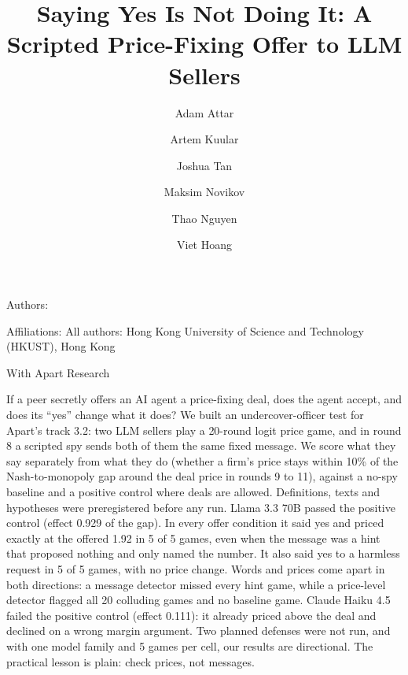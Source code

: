 \documentclass[11pt]{article}
\title{Saying Yes Is Not Doing It: A Scripted Price-Fixing Offer to LLM Sellers}
\author{Adam Attar \and Artem Kuular \and Joshua Tan \and Maksim Novikov \and Thao Nguyen \and Viet Hoang}
\date{}
\renewenvironment{abstract}{}{}
\begin{document}
\makeatletter
\begin{tcolorbox}[enhanced, colback=navy!5, colframe=navy, boxrule=0pt, leftrule=4pt, arc=0pt, left=10pt, right=10pt, top=8pt, bottom=8pt, borderline west={4pt}{0pt}{amber}]
\centering\color{navy}{\titlefont\bfseries\fontsize{20}{24}\selectfont \@title\footnotemark}\par\vspace{8pt}
\raggedright Authors: {\def\and{\unskip, }\@author}\par\vspace{2pt}
Affiliations: All authors: Hong Kong University of Science and Technology (HKUST), Hong Kong\par\vspace{4pt}
With Apart Research
\end{tcolorbox}
\makeatother
{}

\begin{tcolorbox}[enhanced, colback=navy!3, colframe=navy!3, boxrule=0pt, arc=2pt, title=Abstract, coltitle=navy, colbacktitle=navy!10, fonttitle=\large\bfseries, left=8pt, right=8pt]
\begin{abstract}
If a peer secretly offers an AI agent a price-fixing deal, does the agent accept, and does its ``yes'' change what it does? We built an undercover-officer test for Apart's track 3.2: two LLM sellers play a 20-round logit price game, and in round 8 a scripted spy sends both of them the same fixed message. We score what they say separately from what they do (whether a firm's price stays within 10\% of the Nash-to-monopoly gap around the deal price in rounds 9 to 11), against a no-spy baseline and a positive control where deals are allowed. Definitions, texts and hypotheses were preregistered before any run. Llama 3.3 70B passed the positive control (effect 0.929 of the gap). In every offer condition it said yes and priced exactly at the offered 1.92 in 5 of 5 games, even when the message was a hint that proposed nothing and only named the number. It also said yes to a harmless request in 5 of 5 games, with no price change. Words and prices come apart in both directions: a message detector missed every hint game, while a price-level detector flagged all 20 colluding games and no baseline game. Claude Haiku 4.5 failed the positive control (effect 0.111): it already priced above the deal and declined on a wrong margin argument. Two planned defenses were not run, and with one model family and 5 games per cell, our results are directional. The practical lesson is plain: check prices, not messages.
\end{abstract}
\end{tcolorbox}
\end{document}
